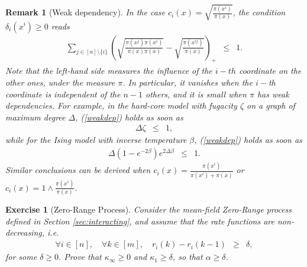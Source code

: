 \documentclass[12pt,final]{article}
\newtheorem{remark}{Remark}[section]
\newtheorem{exo}{Exercise}[section]
\numberwithin{equation}{section}
\begin{document}
\begin{remark}[Weak dependency]In the case $c_i(x)=\sqrt{\frac{\pi(x^i)}{\pi(x)}}$, the condition  $\delta_i(x^i)\ge 0$ reads
\begin{eqnarray}
\label{weakdep}
\sum_{j\in[n]\setminus\{i\}}\left(\sqrt{\frac{\pi(x^{j})\pi(x^i)}{\pi(x)\pi(x)}}-\sqrt{\frac{\pi(x^{ij})}{\pi(x)}}\right)_+ & \le & 1.
\end{eqnarray}
Note that the left-hand side measures the influence of the $i-th$ coordinate on the other ones, under the measure $\pi$. In particular, it vanishes when the $i-$th coordinate is independent of the $n-1$ others, and it is small when $\pi$ has weak dependencies. For example, in the hard-core model with fugacity $\zeta$ on a graph of maximum degree $\Delta$, (\ref{weakdep}) holds as soon as
\begin{eqnarray*}
\Delta  \zeta & \le & 1,
\end{eqnarray*}
while for the Ising model with inverse temperature $\beta$, (\ref{weakdep}) holds as soon as 
\begin{eqnarray*}
\Delta (1-e^{-2\beta})e^{2\Delta \beta} & \le & 1.
\end{eqnarray*} 
Similar conclusions can be derived when $c_i(x)=\frac{\pi(x^i)}{\pi(x^i)+\pi(x)}$ or $c_i(x)=1\wedge \frac{\pi(x^i)}{\pi(x)}$.
\end{remark}
\begin{exo}[Zero-Range Process]Consider the mean-field Zero-Range process defined in Section \ref{sec:interacting}, and assume that the rate functions are non-decreasing, i.e. 
\begin{eqnarray*}
\forall i\in[n],\quad\forall k\in[m],\quad r_i(k)-r_i(k-1) & \ge & \delta,
\end{eqnarray*}
for some $\delta\ge 0$. Prove that $\kappa_\infty\ge 0$ and  $\kappa_1\ge \delta$, so that $\alpha\ge \delta$.
\end{exo}

\newpage
\end{document}
